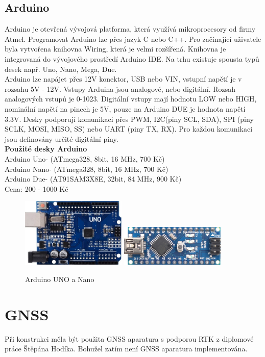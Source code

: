 \subsection{Arduino} 
Arduino je otevřená vývojová platforma, která využívá mikroprocesory od firmy \mbox{Atmel}. Programovat Arduino lze přes jazyk C nebo C++. Pro začínající uživatele byla vytvořena knihovna Wiring, která je velmi rozšířená. Knihovna je integrovaná do vývojového prostředí Arduino IDE. Na trhu existuje spousta typů desek např. Uno, Nano, Mega, Due. \\
Arduino lze napájet přes 12V konektor, USB nebo VIN, vstupní napětí je v rozsahu 5V - 12V. Vstupy Arduina jsou analogové, nebo digitální. Rozsah analogových \mbox{vstupů} je 0-1023. Digitální vstupy mají hodnotu LOW nebo HIGH, nominální napětí na pinech je 5V, pouze na Arduino DUE je hodnota napětí 3.3V. Desky podporují komunikaci přes PWM, I2C(piny SCL, SDA), SPI (piny SCLK, MOSI, MISO, SS) nebo UART (piny TX, RX). Pro každou komunikaci jsou definovány určité digitální piny.\\

\textbf{Použité desky Arduino}\\
Arduino Uno- (ATmega328, 8bit, 16 MHz, 700 Kč)\\
Arduino Nano- (ATmega328, 8bit, 16 MHz, 700 Kč)\\
Arduino Due- (AT91SAM3X8E, 32bit, 84 MHz, 900 Kč)\\
Cena: 200 - 1000 Kč\\

\begin{figure}[H]
	\centering
	\includegraphics[width=5cm]{pictures/uno.jpg}
	\includegraphics[width=5cm]{pictures/nano.jpg}
	\caption{Arduino UNO a Nano}
\end{figure}

\section{GNSS}
Při konstrukci měla být použita GNSS aparatura s podporou RTK z diplomové práce Štěpána Hodíka. Bohužel zatím není GNSS aparatura implementována.\\

